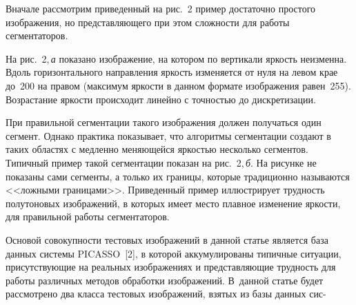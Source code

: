 \begin{multicols}{2}
  Вначале рассмотрим приведенный на рис.~2 пример достаточно простого 
изображения, но пред\-став\-ля\-юще\-го при этом сложности для работы 
сегментаторов.
        

На рис.~2,\,\textit{а} показано изображение, на котором по вертикали яркость 
неизменна. Вдоль горизонтального направления яркость изменяется от нуля на 
левом крае до~200 на правом (максимум яркости в данном формате 
изображения равен~255). Возрастание яркости происходит линейно с 
точ\-ностью до дискретизации.
  
  При правильной сегментации такого изображения должен получаться один 
сегмент. Однако практика показывает, что алгоритмы сегментации создают в 
таких областях с медленно меняющейся яркостью несколько сегментов. 
Типичный пример такой сегментации показан на рис.~2,\,\textit{б}. На рисунке не 
показаны сами сегменты, а только их границы, которые традиционно 
называются <<ложными границами>>. Приведенный пример иллюстрирует 
трудность полутоновых изображений, в которых имеет место плавное 
изменение яркости, для правильной работы сегментаторов.
  
  Основой совокупности тестовых изображений в данной статье является база 
данных системы \mbox{PICASSO}~[2], в которой аккумулированы типичные 
ситуации, присутствующие на реальных изоб\-ра\-же\-ни\-ях и представляющие 
трудность для работы различных методов обработки изображений. В~данной 
статье будет рассмотрено два класса тес\-то\-вых изоб\-ра\-же\-ний, взятых из базы 
данных сис-\linebreak\vspace*{-12pt}
\pagebreak

\end{multicols}

\begin{figure} %
\vspace*{1pt}
\begin{center}
\mbox{%
\epsfxsize=141.365mm
}
\end{center}
\vspace*{-11pt}
\vspace*{9pt}
\begin{center}
\mbox{%
\epsfxsize=163.994mm
}
\end{center}
\vspace*{-11pt}
\vspace*{9pt}
\begin{center}
\mbox{%
\epsfxsize=163.994mm
}
\end{center}
\vspace*{-11pt}
\end{figure}


